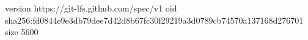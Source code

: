 version https://git-lfs.github.com/spec/v1
oid sha256:fd0844e9e3db79dee7d42d8b67fc30f29219a3d0789cb74570a137168d276701
size 5600

